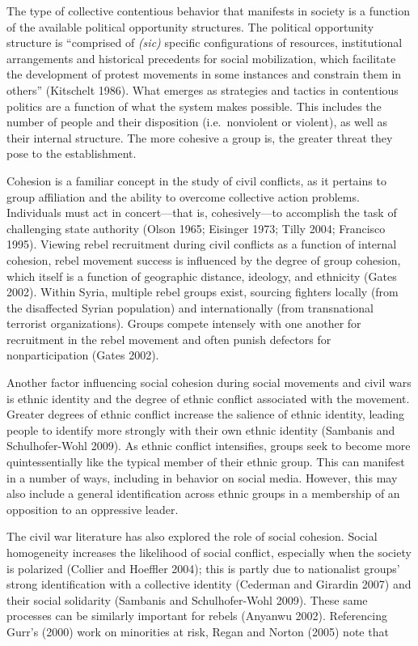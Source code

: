 \documentclass[english,man]{apa6}
\begin{document}
The type of collective contentious behavior that manifests in society is a
function of the available political opportunity structures. The political
opportunity structure is \enquote{comprised of \emph{(sic)} specific configurations of
resources, institutional arrangements and historical precedents for social
mobilization, which facilitate the development of protest movements in some
instances and constrain them in others} (Kitschelt 1986). What emerges
as strategies and tactics in contentious politics are a function of
what the system makes possible. This includes the number of people and their
disposition (i.e.~nonviolent or violent), as well as their internal structure.
The more cohesive a group is, the greater threat they pose to the establishment.

Cohesion is a familiar concept in the study of civil conflicts, as it pertains
to group affiliation and the ability to overcome collective action problems.
Individuals must act in concert---that is, cohesively---to accomplish the task
of challenging state authority (Olson 1965; Eisinger 1973; Tilly 2004; Francisco 1995).
Viewing rebel recruitment during civil conflicts as a function of internal
cohesion, rebel movement success is influenced by the degree of group cohesion,
which itself is a function of geographic distance, ideology, and ethnicity
(Gates 2002). Within Syria, multiple rebel groups exist, sourcing
fighters locally (from the disaffected Syrian population) and internationally
(from transnational terrorist organizations). Groups compete intensely with one
another for recruitment in the rebel movement and often punish defectors for
nonparticipation (Gates 2002).

Another factor influencing social cohesion during social movements and civil
wars is ethnic identity and the degree of ethnic conflict associated with the
movement. Greater degrees of ethnic conflict increase the salience of ethnic
identity, leading people to identify more strongly with their own ethnic
identity (Sambanis and Schulhofer-Wohl 2009). As ethnic conflict intensifies, groups seek to become
more quintessentially like the typical member of their ethnic group. This can
manifest in a number of ways, including in behavior on social media. However,
this may also include a general identification across ethnic groups in a
membership of an opposition to an oppressive leader.

The civil war literature has also explored the role of social cohesion. Social
homogeneity increases the likelihood of social conflict, especially when the
society is polarized (Collier and Hoeffler 2004); this is partly due to nationalist
groups' strong identification with a collective identity (Cederman and Girardin 2007)
and their social solidarity (Sambanis and Schulhofer-Wohl 2009). These same processes can be
similarly important for rebels (Anyanwu 2002). Referencing Gurr's
(2000) work on minorities at risk, Regan and Norton
(2005) note that
\end{document}
